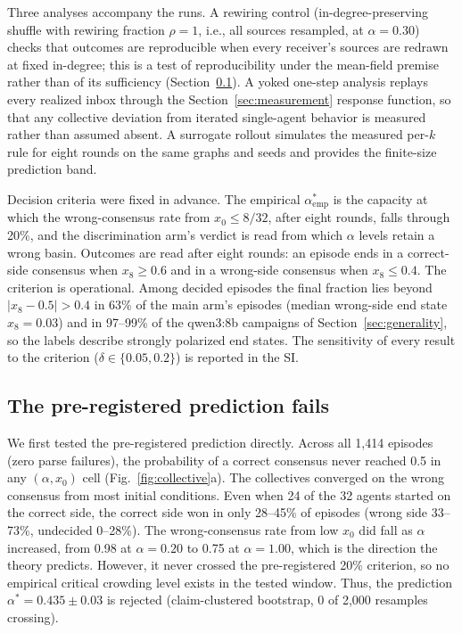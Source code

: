 \documentclass[11pt]{article}
\newcommand{\astar}{\alpha^{*}}
\begin{document}
Three analyses accompany the runs. A rewiring control
(in-degree-preserving shuffle with rewiring fraction $\rho = 1$, i.e., all
sources resampled, at $\alpha = 0.30$) checks that outcomes are
reproducible when every receiver's sources are redrawn at fixed in-degree;
this is a test of reproducibility under the mean-field premise rather than
of its sufficiency (Section~\ref{sec:results}). A yoked one-step analysis
replays every realized inbox through the Section~\ref{sec:measurement}
response function, so that any collective deviation from iterated
single-agent behavior is measured rather than assumed absent. A surrogate
rollout simulates the measured per-$k$ rule for eight rounds on the same
graphs and seeds and provides the finite-size prediction band.

Decision criteria were fixed in advance. The empirical
$\astar_{\mathrm{emp}}$ is the capacity at which the wrong-consensus rate
from $x_0 \le 8/32$, after eight rounds, falls through 20\%, and the
discrimination arm's verdict is read from which $\alpha$ levels retain a
wrong basin. Outcomes are read after eight rounds: an episode ends in a
correct-side consensus when $x_8 \ge 0.6$ and in a wrong-side consensus
when $x_8 \le 0.4$. The criterion is operational. Among decided episodes
the final fraction lies beyond $|x_8 - 0.5| > 0.4$ in 63\% of the main
arm's episodes (median wrong-side end state $x_8 = 0.03$) and in 97--99\%
of the qwen3:8b campaigns of Section~\ref{sec:generality}, so the labels
describe strongly polarized end states. The sensitivity of every result to
the criterion ($\delta \in \{0.05, 0.2\}$) is reported in the SI.

\subsection{The pre-registered prediction fails}\label{sec:results}

We first tested the pre-registered prediction directly. Across all 1{,}414
episodes (zero parse failures), the probability of a correct consensus
never reached 0.5 in any $(\alpha, x_0)$ cell (Fig.~\ref{fig:collective}a).
The collectives converged on the wrong consensus from most initial
conditions. Even when 24 of the 32 agents started on the correct side, the
correct side won in only 28--45\% of episodes (wrong side 33--73\%,
undecided 0--28\%). The wrong-consensus rate from low $x_0$ did fall as
$\alpha$ increased, from 0.98 at $\alpha = 0.20$ to 0.75 at
$\alpha = 1.00$, which is the direction the theory predicts. However, it
never crossed the pre-registered 20\% criterion, so no empirical critical
crowding level exists in the tested window. Thus, the prediction
$\astar = 0.435 \pm 0.03$ is rejected (claim-clustered bootstrap, 0 of
2{,}000 resamples crossing).
\end{document}
